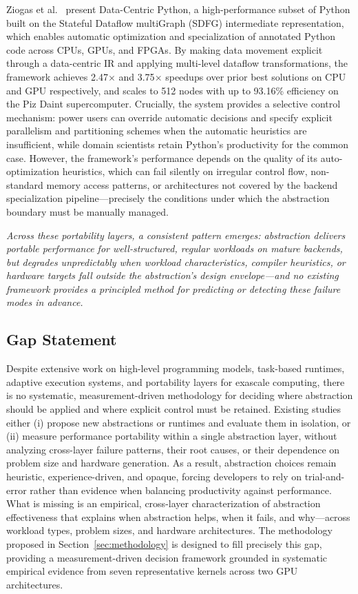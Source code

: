Ziogas et al.~\cite{ziogas2025dace} present Data-Centric Python, a
high-performance subset of Python built on the Stateful Dataflow multiGraph
(SDFG) intermediate representation, which enables automatic optimization and
specialization of annotated Python code across CPUs, GPUs, and FPGAs. By
making data movement explicit through a data-centric IR and applying multi-level
dataflow transformations, the framework achieves 2.47$\times$ and 3.75$\times$
speedups over prior best solutions on CPU and GPU respectively, and scales to
512 nodes with up to 93.16\% efficiency on the Piz Daint supercomputer.
Crucially, the system provides a selective control mechanism: power users can
override automatic decisions and specify explicit parallelism and partitioning
schemes when the automatic heuristics are insufficient, while domain scientists
retain Python's productivity for the common case. However, the framework's
performance depends on the quality of its auto-optimization heuristics, which
can fail silently on irregular control flow, non-standard memory access
patterns, or architectures not covered by the backend specialization
pipeline---precisely the conditions under which the abstraction boundary must
be manually managed.

\textit{Across these portability layers, a consistent pattern emerges:
abstraction delivers portable performance for well-structured, regular workloads
on mature backends, but degrades unpredictably when workload characteristics,
compiler heuristics, or hardware targets fall outside the abstraction's design
envelope---and no existing framework provides a principled method for predicting
or detecting these failure modes in advance.}

\subsection*{Gap Statement}

Despite extensive work on high-level programming models, task-based runtimes,
adaptive execution systems, and portability layers for exascale computing, there
is no systematic, measurement-driven methodology for deciding where abstraction
should be applied and where explicit control must be retained. Existing studies
either (i) propose new abstractions or runtimes and evaluate them in isolation,
or (ii) measure performance portability within a single abstraction layer,
without analyzing cross-layer failure patterns, their root causes, or their
dependence on problem size and hardware generation. As a result, abstraction
choices remain heuristic, experience-driven, and opaque, forcing developers to
rely on trial-and-error rather than evidence when balancing productivity against
performance. What is missing is an empirical, cross-layer characterization of
abstraction effectiveness that explains when abstraction helps, when it fails,
and why---across workload types, problem sizes, and hardware architectures. The
methodology proposed in Section~\ref{sec:methodology} is designed to fill
precisely this gap, providing a measurement-driven decision framework grounded
in systematic empirical evidence from seven representative kernels across two
GPU architectures.
